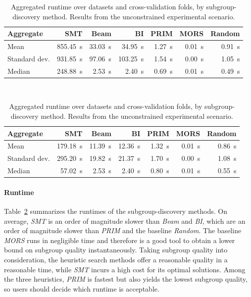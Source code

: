 \documentclass{article}
\theoremstyle{definition}
\begin{document}
\begin{table}[t]
	\centering
	\begin{subtable}{\textwidth}
		\centering
		\begin{tabular}{lrrrrrr}
			\toprule
			Aggregate & SMT & Beam & BI & PRIM & MORS & Random \\
			\midrule
			Mean & 855.45~s & 33.03~s & 34.95~s & 1.27~s & 0.01~s & 0.91~s \\
			Standard dev. & 931.85~s & 97.06~s & 103.25~s & 1.54~s & 0.00~s & 1.05~s \\
			Median & 248.88~s & 2.53~s & 2.40~s & 0.69~s & 0.01~s & 0.49~s \\
			\bottomrule
		\end{tabular}
		\caption{
			All datasets.
		}
		\label{tab:csd:unconstrained-runtime-all-datasets}
	\end{subtable}
	\\ \vspace{\baselineskip}
	\begin{subtable}{\textwidth}
		\centering
		\begin{tabular}{lrrrrrr}
			\toprule
			Aggregate & SMT & Beam & BI & PRIM & MORS & Random \\
			\midrule
			Mean & 179.18~s & 11.39~s & 12.36~s & 1.32~s & 0.01~s & 0.86~s \\
			Standard dev. & 295.20~s & 19.82~s & 21.37~s & 1.70~s & 0.00~s & 1.08~s \\
			Median & 57.02~s & 2.53~s & 2.40~s & 0.80~s & 0.01~s & 0.55~s \\
			\bottomrule
		\end{tabular}
		\caption{
			Datasets without \emph{SMT} timeouts.
		}
		\label{tab:csd:unconstrained-runtime-no-timeout-datasets}
	\end{subtable}
	\caption{
		Aggregated runtime over datasets and cross-validation folds, by subgroup-discovery method.
		Results from the unconstrained experimental scenario.
	}
	\label{tab:csd:unconstrained-runtime}
\end{table}

\paragraph{Runtime}

Table~\ref{tab:csd:unconstrained-runtime} summarizes the runtimes of the subgroup-discovery methods.
On average, \emph{SMT} is an order of magnitude slower than \emph{Beam} and \emph{BI}, which are an order of magnitude slower than \emph{PRIM} and the baseline \emph{Random}.
The baseline \emph{MORS} runs in negligible time and therefore is a good tool to obtain a lower bound on subgroup quality instantaneously.
Taking subgroup quality into consideration, the heuristic search methods offer a reasonable quality in a reasonable time, while \emph{SMT} incurs a high cost for its optimal solutions.
Among the three heuristics, \emph{PRIM} is fastest but also yields the lowest subgroup quality, so users should decide which runtime is acceptable.
\end{document}
